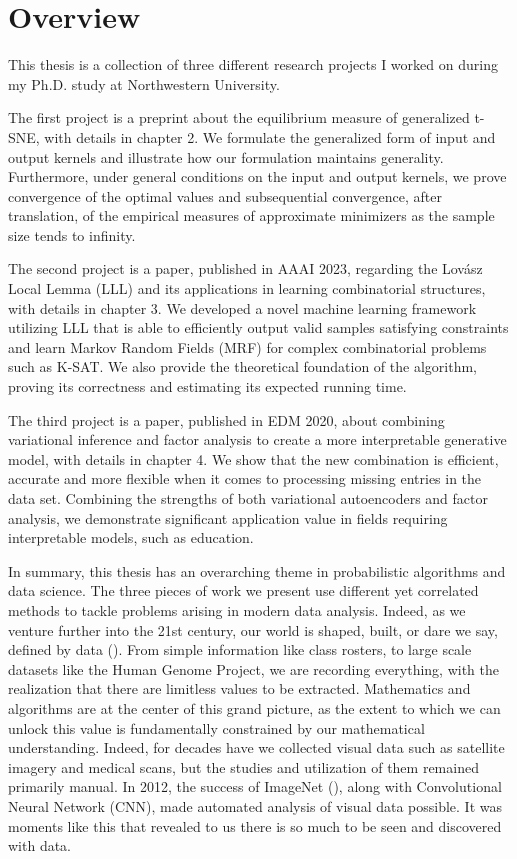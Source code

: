 \section{Overview} \label{intro_chap:sec:layout}
This thesis is a collection of three different research projects I worked on
during my Ph.D. study at Northwestern University.

The first project is a preprint about the equilibrium measure of generalized
t-SNE, with details in chapter 2. We formulate the generalized form of input
and output kernels and illustrate how our formulation maintains generality.
Furthermore, under general conditions on the input and output kernels,
we prove convergence of the optimal values and subsequential convergence,
after translation, of the empirical measures of approximate minimizers
as the sample size tends to infinity.

The second project is a paper, published in AAAI 2023, regarding the Lov\'asz Local
Lemma (LLL) and its applications in learning combinatorial structures, with
details in chapter 3. We developed a novel machine learning framework utilizing
LLL that is able to efficiently output valid samples satisfying constraints and
learn Markov Random Fields (MRF) for complex combinatorial problems such as
K-SAT. We also provide the theoretical foundation of the algorithm, proving its
correctness and estimating its expected running time.

The third project is a paper, published in EDM 2020, about combining
variational inference and factor analysis to create a more interpretable
generative model, with details in chapter 4. We show that the new combination
is efficient, accurate and more flexible when it comes to processing missing
entries in the data set. Combining the strengths of both variational
autoencoders and factor analysis, we demonstrate significant application value
in fields requiring interpretable models, such as education.

In summary, this thesis has an overarching theme in probabilistic algorithms
and data science. The three pieces of work we present use different yet
correlated methods to tackle problems arising in modern data analysis. Indeed,
as we venture further into the 21st century, our world is shaped, built, or
dare we say, defined by data (\cite{hey2009the}). From simple information like
class rosters, to large scale datasets like the Human Genome Project, we are
recording everything, with the realization that there are limitless values to
be extracted. Mathematics and algorithms are at the center of this grand
picture, as the extent to which we can unlock this value is fundamentally
constrained by our mathematical understanding. Indeed, for decades have we
collected visual data such as satellite imagery and medical scans, but the
studies and utilization of them remained primarily manual. In 2012, the success
of ImageNet (\cite{NIPS2012_c399862d}), along with Convolutional Neural Network
(CNN), made automated analysis of visual data possible. It was moments like
this that revealed to us there is so much to be seen and discovered with data.

